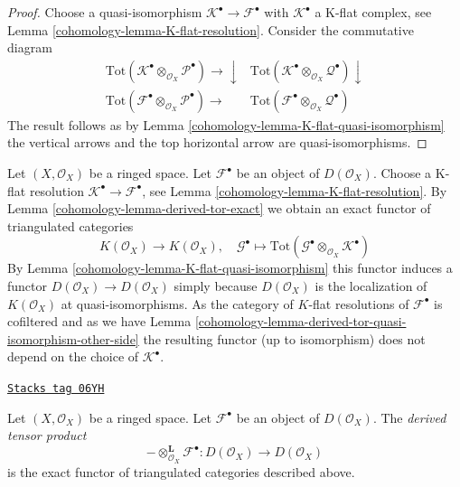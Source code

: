 \begin{proof}

Choose a quasi-isomorphism $\mathcal{K}^\bullet \to \mathcal{F}^\bullet$
with $\mathcal{K}^\bullet$ a K-flat complex, see
Lemma \ref{cohomology-lemma-K-flat-resolution}.
Consider the commutative diagram
$$
\begin{array}{cc}\text{Tot}(\mathcal{K}^\bullet
\otimes_{\mathcal{O}_X} \mathcal{P}^\bullet) \longrightarrow\downarrow & \text{Tot}(\mathcal{K}^\bullet
\otimes_{\mathcal{O}_X} \mathcal{Q}^\bullet) \downarrow \\ \text{Tot}(\mathcal{F}^\bullet
\otimes_{\mathcal{O}_X} \mathcal{P}^\bullet) \longrightarrow & \text{Tot}(\mathcal{F}^\bullet
\otimes_{\mathcal{O}_X} \mathcal{Q}^\bullet)\end{array}
$$
The result follows as by
Lemma \ref{cohomology-lemma-K-flat-quasi-isomorphism}
the vertical arrows and the top horizontal arrow are quasi-isomorphisms.
\end{proof}

Let $(X, \mathcal{O}_X)$ be a ringed space.
Let $\mathcal{F}^\bullet$ be an object of $D(\mathcal{O}_X)$.
Choose a K-flat resolution $\mathcal{K}^\bullet \to \mathcal{F}^\bullet$, see
Lemma \ref{cohomology-lemma-K-flat-resolution}.
By
Lemma \ref{cohomology-lemma-derived-tor-exact}
we obtain an exact functor of triangulated categories
$$
K(\mathcal{O}_X)
\longrightarrow
K(\mathcal{O}_X),
\quad
\mathcal{G}^\bullet
\longmapsto
\text{Tot}(\mathcal{G}^\bullet \otimes_{\mathcal{O}_X} \mathcal{K}^\bullet)
$$
By
Lemma \ref{cohomology-lemma-K-flat-quasi-isomorphism}
this functor induces a functor
$D(\mathcal{O}_X) \to D(\mathcal{O}_X)$ simply because
$D(\mathcal{O}_X)$ is the localization of $K(\mathcal{O}_X)$
at quasi-isomorphisms. As the category of $K$-flat resolutions
of $\mathcal{F}^\bullet$ is cofiltered and as we have
Lemma \ref{cohomology-lemma-derived-tor-quasi-isomorphism-other-side}
the resulting functor (up to isomorphism)
does not depend on the choice of $\mathcal{K}^\bullet$.

\begin{definition}
\label{cohomology-definition-derived-tor}
\href{https://stacks.math.columbia.edu/tag/06YH}{\texttt{Stacks tag 06YH}}

Let $(X, \mathcal{O}_X)$ be a ringed space.
Let $\mathcal{F}^\bullet$ be an object of $D(\mathcal{O}_X)$.
The {\it derived tensor product}
$$
- \otimes_{\mathcal{O}_X}^{\mathbf{L}} \mathcal{F}^\bullet :
D(\mathcal{O}_X)
\longrightarrow
D(\mathcal{O}_X)
$$
is the exact functor of triangulated categories described above.
\end{definition}

